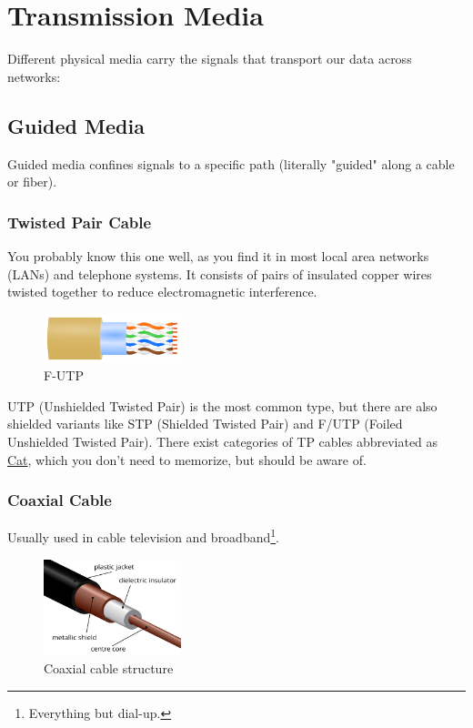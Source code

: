 \section{Transmission Media}\label{sec:transmission_media}
Different physical media carry the signals that transport our data across networks:

\subsection*{Guided Media}
Guided media confines signals to a specific path (literally "guided" along a cable or fiber). 

\subsubsection*{Twisted Pair Cable}
You probably know this one well, as you find it in most local area networks (LANs) and telephone systems. It consists of pairs of insulated copper wires twisted together to reduce electromagnetic interference.

\begin{figure}[h]
    \centering
    \includegraphics[width=4cm]{assets/osi/physical/f-utp.png}
    \caption{F-UTP}\label{fig:twisted_pair}
\end{figure}

UTP (Unshielded Twisted Pair) is the most common type, but there are also shielded variants like STP (Shielded Twisted Pair) and F/UTP (Foiled Unshielded Twisted Pair). There exist categories of TP cables abbreviated as \href{https://en.wikipedia.org/wiki/Category:Ethernet_cables}{Cat}, which you don't need to memorize, but should be aware of. 

\subsubsection*{Coaxial Cable}
Usually used in cable television and broadband\footnote{Everything but dial-up.}.

\begin{figure}[h]
    \centering
    \includegraphics[width=4cm]{assets/osi/physical/coax.png}
    \caption{Coaxial cable structure}\label{fig:coaxial_cable}
\end{figure}

